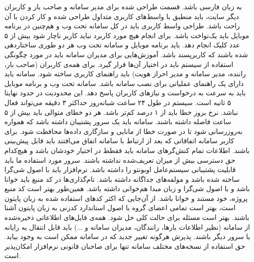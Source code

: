 \newpage
{}

	 
	
		 به زبان فارسی باشد.
		 قسمت طراحی شده برای مدیر سامانه و صاحب بار و کاربران دیگر سایت، باید منطبق با واسط‌های کاربری متداول طراحی شده و کار کردن با آن راحت باشد.
		 طراحی واسط کاربری باید در کل سامانه تحت وب و هم‌چنین در برنامه موبایل باید یک‌نواخت باشد.
		 برای انجام هیچ مورد کاربرد نباید کاربر ناچار شود بیش از ۵ عدد کلیک انجام دهد.
		 باید برنامه موبایل و سامانه تحت وب هر دو طوری ساختاردهی شده باشند که کاربرپسند باشد.
	 
		 آموزش‌هایی برای مدیران سامانه باید در مورد چگونگی استفاده از سیستم باید در اختیار آن‌ها قرار گیرد.
		 برای همه‌ی کاربران‌ (صاحب بار، راننده، مدیر سامانه و مدیر احراز هویت) باید راهنمای کاربری ساخته شود.
		 سامانه باید دارای یک راهنمای عملیاتی برای نصب سامانه باشد.
	 
		 سامانه تحت وب و برنامه موبایل باید به سرعت به درخواست و نیازهای کاربران پاسخ دهد. این محدودیت در حدود نهایتا ۵ ثانیه است.
	 
		 سیستم در طول ۲۴ ساعت شبانه‌روز حداکثر ۳ دقیقه می‌تواند فعال نباشد.
		 نرخ بروز خطا باید از ۱ درصد کم‌تر باشد.
		 هر دو خطای متوالی باید بیش از ۵ ساعت فاصله داشته باشند.
		 سامانه باید یک سرور پشتیبان داشته باشد که همواره به‌روزرسانی شود تا در صورت خطا از مانایی و سازگاری داده‌ها محافظت شود.
		 برای کاربر سامانه اتفاقاتی که بعد از ارتباط با سامانه اتفاق می‌افتند باید قابل پیش‌بینی باشند.
	 
		 اطلاعات تمام کنش‌گرهای سامانه باید فقطط در اختیار خودشان باشد و هیچ‌کدام حق دسترسی بیش از میزان تعریف‌شده نداشته باشند.
	 
		 سرور مورد استفاده ما باید قابلیت پشتیبانی سیستم‌عامل اوبونتو را داشته باشد.
	 
		 نرم‌افزار باید با اصول شی‌گرا ساخته شده باشد و مولفه‌های جداگانه داشته باشد.
		 نام‌گذاری‌ها در کد منبع باید خوانا باشد و با اصول شی‌گرا و زبان مبدا هم‌خوانی داشته باشد. همین‌طور بهتر است کد منبع پروژه، خود مستند و خوانا باشد.
		 از آن‌جایی که اکثر کدهای استفاده شده به زبان پایتون است، بهتر است تمامی اعضای گروه با اصول استاندارد کدزنی به زبان پایتون آشنا باشند.
	 
		 بهتر است مسئله برای حالت کلی حل شود.
	 
		 همه‌ی فایل‌های اطلاعاتی ذخیره‌شده از سامانه (نظیر اطلاعات بارها، رانندگان، مدیران سامانه و ...) باید قابل انتقال به رایانه یا سرور دیگر باشند.
	 
		 پذیرش هرگونه تغییر جدید که در سامانه ممکن است به وجود بیاید.
	 
		 حق استفاده از نسخه‌های مختلف سامانه تنها برای صاحبان قانونی نرم‌افزار امکان‌پذیر است.
